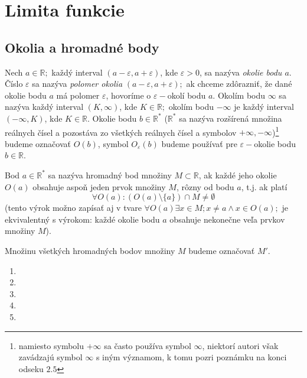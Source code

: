 \chapter{Limita funkcie}%

\section{Okolia a hromadné body}
Nech $a \in \mathbb{R};$ každý interval $(a-\varepsilon,a+\varepsilon)$, kde
$\varepsilon > 0$, sa nazýva \textit{okolie bodu $a$}. Číslo $\varepsilon$ sa
nazýva \textit{polomer okolia} $(a-\varepsilon,a+\varepsilon);$ ak chceme
zdôrazniť, že dané okolie bodu $a$ má polomer $\varepsilon$, hovoríme o
$\varepsilon-$okolí bodu $a$. Okolím bodu $\infty$ sa nazýva každý interval
$(K,\infty)$, kde $K \in \mathbb{R};$ okolím bodu $- \infty$ je každý interval
$(- \infty,K)$, kde $K \in \mathbb{R}.$ Okolie bodu $b \in \mathbb{R^*}$
($\mathbb{R^*}$ sa nazýva rozšírená množina reálnych čísel a pozostáva zo
všetkých reálnych čísel a symbolov $+\infty,-\infty$)\footnote{namiesto symbolu
$+\infty$ sa často používa symbol $\infty$, niektorí autori však zavádzajú
symbol $\infty$ s iným významom, k tomu pozri poznámku na konci odseku $2.5$}
budeme označovať $O(b)$, symbol $O_\varepsilon (b)$ budeme používať pre
$\varepsilon-$okolie bodu $b \in \mathbb{R}$.

Bod $a \in \mathbb{R^*}$ sa nazýva hromadný bod množiny $M \subset \mathbb{R}$,
ak každé jeho okolie $O(a)$ obsahuje aspoň jeden prvok množiny $M$, rôzny od
bodu $a$, t.j. ak platí
\[
  \forall O(a): (O(a) \setminus \{ a \}) \cap M \neq \emptyset
\]
(tento výrok možno zapísať aj v tvare $\forall O(a) \exists x\in M; x \neq a
\wedge x \in O(a);$ je ekvivalentný s výrokom: každé okolie bodu $a$ obsahuje
nekonečne veľa prvkov množiny $M$).

Množinu všetkých hromadných bodov množiny $M$ budeme označovať $M'$.

\begin{enumerate}[resume]
  \item {}
  \item {}
  \item {}
  \item {}
  \item {}
\end{enumerate}

